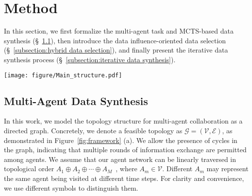 \section{Method}
\label{section:method}
In this section, we first formalize the multi-agent task and MCTS-based data synthesis (§~\ref{subsection:multi-agent-data-synthesis}), then introduce the data influence-oriented data selection
(§~\ref{subsection:hybrid data selection}), and finally present the iterative data synthesis process (§~\ref{subsection:iterative data synthesis}).

\begin{figure*}
    \centering
    \texttt{[image: figure/Main\_structure.pdf]}
    \caption{Overview of our method. (a) illustrates the traversal of a cyclic agent network in topological order. We introduce virtual agents to distinguish the same agent in the traversal. (b) showcases the application of MCTS to generate synthetic multi-agent training data, where the color of each agent represents the magnitude of the node's Q-value. (c) depicts the computation process of influence scores for a non-differentiable metric, highlighting that data points with high Q-values may correspond to low influence scores.} 
    \vspace{-0.3cm}
    \label{fig:framework}
\end{figure*}

\subsection{Multi-Agent Data Synthesis} \label{subsection:multi-agent-data-synthesis}
In this work, we model the topology structure for multi-agent collaboration as a directed graph. Concretely, we denote a feasible topology as $\mathcal{G}=(\mathcal{V}, \mathcal{E})$, as demonstrated in Figure~\ref{fig:framework} (a). We allow the presence of cycles in the graph, indicating that multiple rounds of information exchange are permitted among agents. We assume that our agent network can be linearly traversed in topological order $A_1\oplus A_2 \oplus \cdots \oplus A_M$~\cite{Bondy1976, book:gross:2005, qian2024}, where $A_m \in \mathcal{V}$. Different $A_m$ may represent the same agent being visited at different time steps. For clarity and convenience, we use different symbols to distinguish them.

